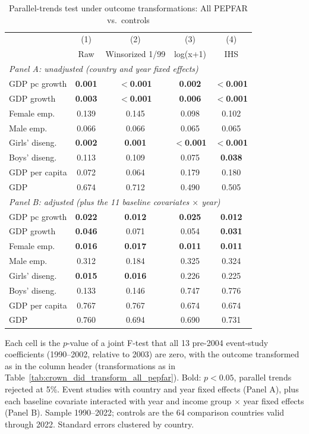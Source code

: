 \begin{table}[htbp]
\centering
\caption{Parallel-trends test under outcome transformations: All PEPFAR vs.\ controls}
\label{tab:crown_pretrends_transform_all_pepfar}
\begin{tabular}{lcccc}
\toprule
 & (1) & (2) & (3) & (4) \\
 & Raw & Winsorized 1/99 & log(x+1) & IHS \\
\midrule
\multicolumn{5}{l}{\textit{Panel A: unadjusted (country and year fixed effects)}} \\
GDP pc growth & \textbf{0.001} & \textbf{$<$0.001} & \textbf{0.002} & \textbf{$<$0.001} \\
GDP growth & \textbf{0.003} & \textbf{$<$0.001} & \textbf{0.006} & \textbf{$<$0.001} \\
Female emp. & 0.139 & 0.145 & 0.098 & 0.102 \\
Male emp. & 0.066 & 0.066 & 0.065 & 0.065 \\
Girls' diseng. & \textbf{0.002} & \textbf{0.001} & \textbf{$<$0.001} & \textbf{$<$0.001} \\
Boys' diseng. & 0.113 & 0.109 & 0.075 & \textbf{0.038} \\
GDP per capita & 0.072 & 0.064 & 0.179 & 0.180 \\
GDP & 0.674 & 0.712 & 0.490 & 0.505 \\
\midrule
\multicolumn{5}{l}{\textit{Panel B: adjusted (plus the 11 baseline covariates $\times$ year)}} \\
GDP pc growth & \textbf{0.022} & \textbf{0.012} & \textbf{0.025} & \textbf{0.012} \\
GDP growth & \textbf{0.046} & 0.071 & 0.054 & \textbf{0.031} \\
Female emp. & \textbf{0.016} & \textbf{0.017} & \textbf{0.011} & \textbf{0.011} \\
Male emp. & 0.312 & 0.184 & 0.325 & 0.324 \\
Girls' diseng. & \textbf{0.015} & \textbf{0.016} & 0.226 & 0.225 \\
Boys' diseng. & 0.133 & 0.146 & 0.747 & 0.776 \\
GDP per capita & 0.767 & 0.767 & 0.674 & 0.674 \\
GDP & 0.760 & 0.694 & 0.690 & 0.731 \\
\bottomrule
\end{tabular}
\par\vspace{4pt}
\begin{minipage}{\textwidth}\footnotesize Each cell is the $p$-value of a joint F-test that all 13 pre-2004 event-study coefficients (1990--2002, relative to 2003) are zero, with the outcome transformed as in the column header (transformations as in Table~\ref{tab:crown_did_transform_all_pepfar}). Bold: $p < 0.05$, parallel trends rejected at 5\%. Event studies with country and year fixed effects (Panel A), plus each baseline covariate interacted with year and income group $\times$ year fixed effects (Panel B). Sample 1990--2022; controls are the 64 comparison countries valid through 2022. Standard errors clustered by country.\end{minipage}
\end{table}
